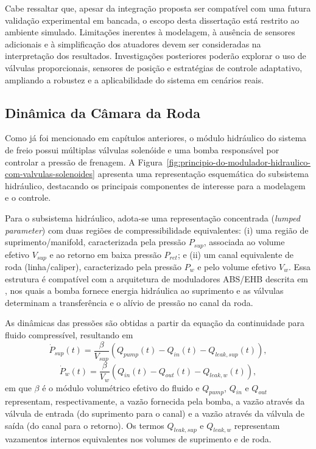 Cabe ressaltar que, apesar da integração proposta ser compatível com uma futura validação experimental em bancada, o escopo desta dissertação está restrito ao ambiente simulado. Limitações inerentes à modelagem, à ausência de sensores adicionais e à simplificação dos atuadores devem ser consideradas na interpretação dos resultados. Investigações posteriores poderão explorar o uso de válvulas proporcionais, sensores de posição e estratégias de controle adaptativo, ampliando a robustez e a aplicabilidade do sistema em cenários reais.

\subsection{Dinâmica da Câmara da Roda}
\label{sec:controle-modelo-hidraulico-2p}

Como já foi mencionado em capítulos anteriores, o módulo hidráulico do sistema de freio possui múltiplas válvulas solenóide e uma bomba responsável por controlar a pressão de frenagem. A Figura~\ref{fig:principio-do-modulador-hidraulico-com-valvulas-solenoides} apresenta uma representação esquemática do subsistema hidráulico, destacando os principais componentes de interesse para a modelagem e o controle.

Para o subsistema hidráulico, adota-se uma representação concentrada (\textit{lumped parameter}) com duas regiões de compressibilidade equivalentes: (i) uma região de suprimento/manifold, caracterizada pela pressão $P_{sup}$, associada ao volume efetivo $V_{sup}$ e ao retorno em baixa pressão $P_{ret}$; e (ii) um canal equivalente de roda (linha/caliper), caracterizado pela pressão $P_{w}$ e pelo volume efetivo $V_{w}$. Essa estrutura é compatível com a arquitetura de moduladores ABS/EHB descrita em , nos quais a bomba fornece energia hidráulica ao suprimento e as válvulas determinam a transferência e o alívio de pressão no canal da roda.

As dinâmicas das pressões são obtidas a partir da equação da continuidade para fluido compressível, resultando em
\begin{equation}
    \dot{P}_{sup}(t) = \frac{\beta}{V_{sup}}\left(Q_{pump}(t) - Q_{in}(t) - Q_{leak,sup}(t)\right),
    \label{eq:psup_dot}
\end{equation}
\begin{equation}
    \dot{P}_{w}(t) = \frac{\beta}{V_{w}}\left(Q_{in}(t) - Q_{out}(t) - Q_{leak,w}(t)\right),
    \label{eq:pw_dot}
\end{equation}
em que $\beta$ é o módulo volumétrico efetivo do fluido e $Q_{pump}$, $Q_{in}$ e $Q_{out}$ representam, respectivamente, a vazão fornecida pela bomba, a vazão através da válvula de entrada (do suprimento para o canal) e a vazão através da válvula de saída (do canal para o retorno). Os termos $Q_{leak,sup}$ e $Q_{leak,w}$ representam vazamentos internos equivalentes nos volumes de suprimento e de roda.

